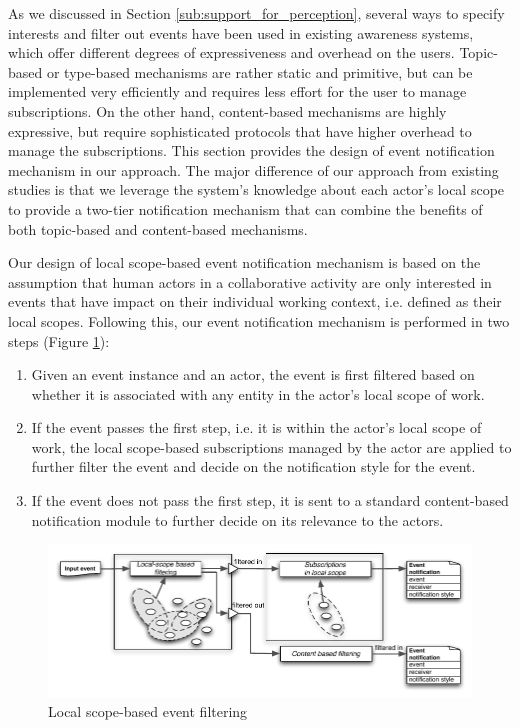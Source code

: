 As we discussed in Section \ref{sub:support_for_perception}, several ways to specify interests and filter out events have been used in existing awareness systems, which offer different degrees of expressiveness and overhead on the users. Topic-based or type-based mechanisms are rather static and primitive, but can be implemented very efficiently and requires less effort for the user to manage subscriptions. On the other hand, content-based mechanisms are highly expressive, but require sophisticated protocols that have higher overhead to manage the subscriptions. This section provides the design of event notification mechanism in our approach. The major difference of our approach from existing studies is that we leverage the system's knowledge about each actor's local scope to provide a two-tier notification mechanism that can combine the benefits of both topic-based and content-based mechanisms. 

Our design of local scope-based event notification mechanism is based on the assumption that human actors in a collaborative activity are only interested in events that have impact on their individual working context, i.e. defined as their local scopes. Following this, our event notification mechanism is performed in two steps (Figure \ref{fig:event_filtering}):
\begin{enumerate}
  	\item Given an event instance and an actor, the event is first filtered based on whether it is associated with any entity in the actor's local scope of work. 
  	\item If the event passes the first step, i.e. it is within the actor's local scope of work, the local scope-based subscriptions managed by the actor are applied to further filter the event and decide on the notification style for the event.
  	\item If the event does not pass the first step, it is sent to a standard content-based notification module to further decide on its relevance to the actors.
\end{enumerate}  

\begin{figure}[htbp] %
	\centering
	\includegraphics{event_filtering.pdf} 
	\caption{Local scope-based event filtering}
	\label{fig:event_filtering}
\end{figure}

